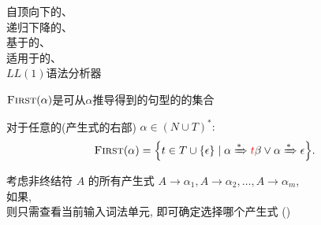 


\begin{frame}{}
  \begin{center}
    自顶向下的、\\[15pt]
    递归下降的、\\[15pt]
    基于的、\\[15pt]
    适用于的、\\[15pt]
    $LL(1)$语法分析器
  \end{center}
\end{frame}




\begin{frame}{}
  \begin{center}

    \vspace{0.60cm}
    $\textsc{First}(\alpha)$是可从$\alpha$推导得到的句型的的集合
    \begin{definition}
      对于任意的(产生式的右部) $\alpha \in (N \cup T)^{\ast}:$
      \[
        \textsc{First}(\alpha) = \Big\{t \in T \cup \{\epsilon\}
          \mid \alpha \xRightarrow[]{\ast} \textcolor{red}{t}\beta \lor \alpha \xRightarrow[]{\ast} \epsilon \Big\}.
      \]
    \end{definition}

    \pause
    \vspace{0.60cm}
    考虑非终结符 $A$ 的所有产生式
    $A \to \alpha_{1}, A \to \alpha_{2}, \dots, A \to \alpha_{m}$, \\[4pt]
    如果, \\[4pt]
    则只需查看当前输入词法单元, 即可确定选择哪个产生式 ()
  \end{center}
\end{frame}

